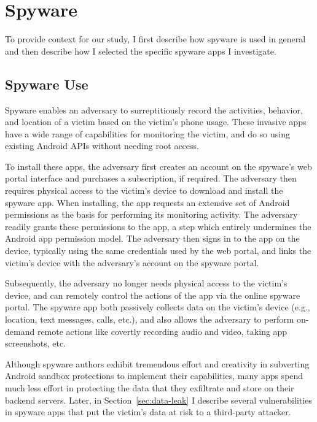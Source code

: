

\section{Spyware}

To provide context for our study, I first describe how spyware is
used in general and then describe how I selected the specific spyware
apps I investigate.

\subsection{Spyware Use}

Spyware enables an adversary to surreptitiously record the activities,
behavior, and location of a victim based on the victim's phone usage.
These invasive apps have a wide range of capabilities for
monitoring the victim, and do so using existing Android APIs without
needing root access.

To install these apps, the adversary first creates an account on the spyware's web portal
interface and purchases a subscription, if required.  The adversary then
requires physical access to the victim's device to download and
install the spyware app.  When installing, the app requests an
extensive set of Android permissions as the basis for performing its
monitoring activity.  The adversary readily grants these permissions to
the app, a step which entirely undermines the Android app permission
model.  The adversary then signs in to the app on the device, typically
using the same credentials used by the web portal, and links the
victim's device with the adversary's account on the spyware portal.

Subsequently, the adversary no longer needs physical access to the victim's device, and
can remotely control the actions of the app via the online spyware portal.
The spyware app both passively collects data on the victim's device (e.g.,
location, text messages, calls, etc.), and also allows the adversary to
perform on-demand remote actions like covertly recording audio and
video, taking app screenshots, etc.

Although spyware authors exhibit tremendous effort and creativity in subverting
Android sandbox protections to implement their capabilities, many apps spend
much less effort in protecting the data that they exfiltrate and store on
their backend servers. Later, in Section~\ref{sec:data-leak} I
describe several vulnerabilities in spyware apps that put the victim's
data at risk to a third-party attacker.



